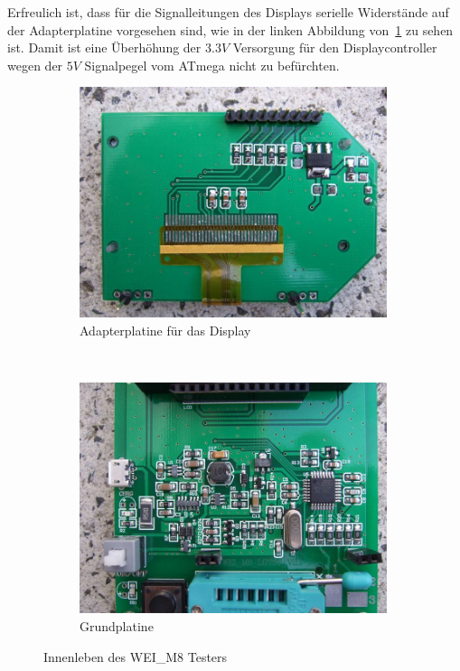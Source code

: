 Erfreulich ist, dass für die Signalleitungen des Displays serielle Widerstände
auf der Adapterplatine vorgesehen sind, wie in der linken Abbildung von~\ref{fig:WeiM8int}
zu sehen ist. Damit ist eine Überhöhung der \(3.3V\) Versorgung für den Displaycontroller
wegen der \(5V\) Signalpegel vom ATmega nicht zu befürchten.

\begin{figure}[H]
  \begin{subfigure}[b]{9cm}
    \centering
    \includegraphics[width=9cm]{../PNG/WEI_M8_D.JPG}
    \caption{Adapterplatine für das Display}
  \end{subfigure}
  ~
  \begin{subfigure}[b]{9cm}
    \centering
    \includegraphics[width=9cm]{../PNG/WEI_M8_L.JPG}
    \caption{Grundplatine}
  \end{subfigure}
  \caption{Innenleben des WEI\_M8 Testers}
  \label{fig:WeiM8int}
\end{figure}


